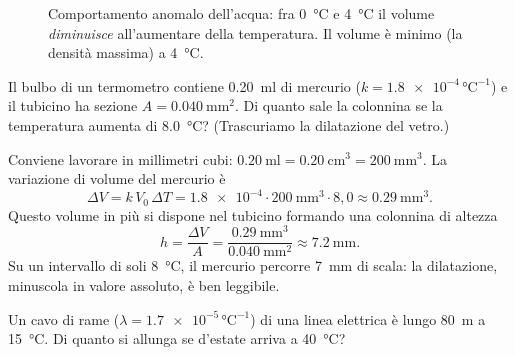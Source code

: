 \begin{figure}[!htbp]
    \centering
    \caption{Comportamento anomalo dell'acqua: fra \SI{0}{\celsius} e \SI{4}{\celsius} il volume \emph{diminuisce} all'aumentare della temperatura. Il volume è minimo (la densità massima) a \SI{4}{\celsius}.}
    \label{fig:anomalia-acqua}
\end{figure}

\begin{testexample}
Il bulbo di un termometro contiene \SI{0,20}{\milli\litre} di mercurio ($k = \num{1,8e-4}\,\si{\celsius}^{-1}$) e il tubicino ha sezione $A = \SI{0,040}{\milli\metre\squared}$. Di quanto sale la colonnina se la temperatura aumenta di \SI{8,0}{\celsius}? (Trascuriamo la dilatazione del vetro.)

Conviene lavorare in millimetri cubi: $\SI{0,20}{\milli\litre} = \SI{0,20}{\centi\metre\cubed} = \SI{200}{\milli\metre\cubed}$. La variazione di volume del mercurio è
\[ \Delta V = k\,V_0\,\Delta T = \num{1,8e-4} \cdot \SI{200}{\milli\metre\cubed} \cdot 8{,}0 \approx \SI{0,29}{\milli\metre\cubed}. \]
Questo volume in più si dispone nel tubicino formando una colonnina di altezza
\[ h = \frac{\Delta V}{A} = \frac{\SI{0,29}{\milli\metre\cubed}}{\SI{0,040}{\milli\metre\squared}} \approx \SI{7,2}{\milli\metre}. \]
Su un intervallo di soli \SI{8}{\celsius}, il mercurio percorre \SI{7}{\milli\metre} di scala: la dilatazione, minuscola in valore assoluto, è ben leggibile.
\end{testexample}

\begin{esercizio}
Un cavo di rame ($\lambda = \num{1,7e-5}\,\si{\celsius}^{-1}$) di una linea elettrica è lungo \SI{80}{\metre} a \SI{15}{\celsius}. Di quanto si allunga se d'estate arriva a \SI{40}{\celsius}?\\
\end{esercizio}


